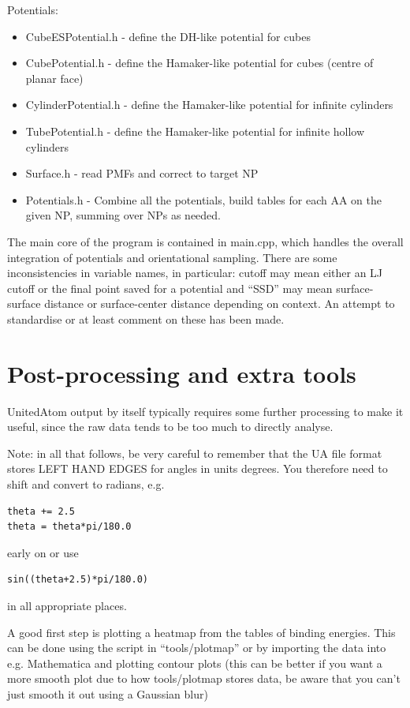\documentclass[10pt,a4paper,onecolumn]{report}
\begin{document}
Potentials:
\begin{itemize}
\item CubeESPotential.h - define the DH-like potential for cubes
\item CubePotential.h - define the Hamaker-like potential for cubes (centre of planar face)
\item CylinderPotential.h - define the Hamaker-like potential for infinite cylinders
\item TubePotential.h - define the Hamaker-like potential for infinite hollow cylinders
\item Surface.h - read PMFs and correct to target NP
\item Potentials.h - Combine all the potentials, build tables for each AA on the given NP, summing over NPs as needed. 
\end{itemize}

The main core of the program is contained in main.cpp, which handles the overall integration of potentials and orientational sampling. There are some inconsistencies in variable names, in particular: cutoff may mean either an LJ cutoff or the final point saved for a potential and ``SSD'' may mean surface-surface distance or surface-center distance depending on context. An attempt to standardise or at least comment on these has been made. 

\section{Post-processing and extra tools}
UnitedAtom output by itself typically requires some further processing to make it useful, since the raw data tends to be too much to directly analyse.

Note: in all that follows, be very careful to remember that the UA file format stores LEFT HAND EDGES for angles in units degrees. You therefore need to shift and convert to radians, e.g.
\begin{lstlisting}
theta += 2.5
theta = theta*pi/180.0
\end{lstlisting}
early on or use
\begin{lstlisting}
sin((theta+2.5)*pi/180.0)
\end{lstlisting}
in all appropriate places.

A good first step is plotting a heatmap from the tables of binding energies. This can be done using the script in ``tools/plotmap'' or by importing the data into e.g. Mathematica and plotting contour plots (this can be better if you want a more smooth plot due to how tools/plotmap stores data, be aware that you can't just smooth it out using a Gaussian blur)
\end{document}
